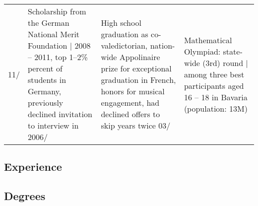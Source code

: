 \begin{longtable}[t]{R{\widthC} p{\widthB}}
11/
& Scholarship from the German National Merit Foundation {\footnotesize$\vert$ 2008 -- 2011, top 1--2\% percent of students in Germany, previously declined invitation to interview in 2006}/
&
High school graduation as co-valedictorian, nation-wide Appolinaire prize for exceptional graduation in French, honors for musical engagement, had declined offers to skip years twice\newline
03/
& Mathematical Olympiad: state-wide (3rd) round {\footnotesize$\vert$ among three best participants aged 16 -- 18 in Bavaria (population: 13M)}
\end{longtable}

\newpage

\subsection*{Experience }
\vspace{.0em}


\subsection*{Degrees}\vspace{-1em}

